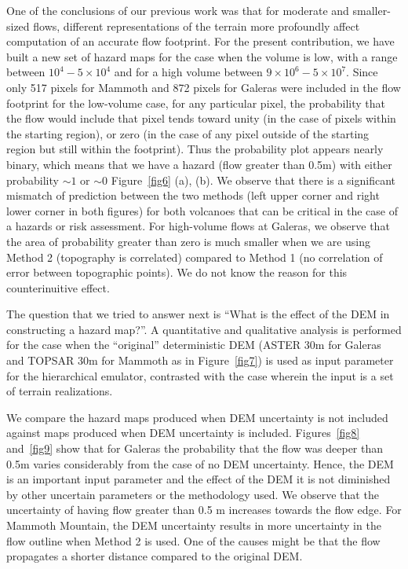 \documentclass[12pt]{article}
\begin{document}
One of the conclusions of our previous work was that for moderate and
smaller-sized flows, different representations of the terrain more
profoundly affect computation of an accurate flow footprint.  For the
present contribution, we have built a new set of hazard maps for the
case when the volume is low, with a range between $10^4 - 5\times
10^4$ and for a high volume between $9\times 10^6 - 5\times 10^7$.
Since only 517 pixels for Mammoth and 872 pixels for Galeras were
included in the flow footprint for the low-volume case, for any
particular pixel, the probability that the flow would include that
pixel tends toward unity (in the case of pixels within the starting
region), or zero (in the case of any pixel outside of the starting
region but still within the footprint).  Thus the probability plot
appears nearly binary, which means that we have a hazard (flow greater
than 0.5m) with either probability $\sim1$ or $\sim0$
Figure~\ref{fig6} (a), (b).  We observe that there is a significant
mismatch of prediction between the two methods (left upper corner and
right lower corner in both figures) for both volcanoes that can be
critical in the case of a hazards or risk assessment.  For high-volume
flows at Galeras, we observe that the area of probability greater than
zero is much smaller when we are using Method 2 (topography is
correlated) compared to Method 1 (no correlation of error between
topographic points). We do not know the reason for this
counterinuitive effect.

The question that we tried to answer next is ``What is the effect of
the DEM in constructing a hazard map?''.  A quantitative and
qualitative analysis is performed for the case when the ``original''
deterministic DEM (ASTER 30m for Galeras and TOPSAR 30m for Mammoth as
in Figure~\ref{fig7}) is used as input parameter for the hierarchical
emulator, contrasted with the case wherein the input is a set of
terrain realizations.

We compare the hazard maps produced when DEM uncertainty is not
included against maps produced when DEM uncertainty is included.
Figures~\ref{fig8} and~\ref{fig9} show that for Galeras the
probability that the flow was deeper than 0.5m varies considerably
from the case of no DEM uncertainty. Hence, the DEM is an important
input parameter and the effect of the DEM it is not diminished by
other uncertain parameters or the methodology used. We observe that
the uncertainty of having flow greater than 0.5 m increases towards
the flow edge. For Mammoth Mountain, the DEM uncertainty results in
more uncertainty in the flow outline when Method 2 is used. One of the
causes might be that the flow propagates a shorter distance compared
to the original DEM.
\end{document}
